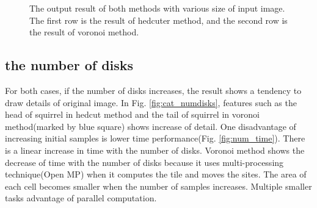 \documentclass[11pt]{article}
\begin{document}
\begin{figure}[hbt]
{    \label{fig:cat_s}
  }\hspace{-3mm}
   \caption{The output result of both methods with various size of input image. The first row is the result of hedcuter method, and the second row is the result of voronoi method. \label{fig:cat_size}}
\end{figure}
\subsection{the number of disks}
For both cases, if the number of disks increases, the result shows a tendency to draw details of original image. In Fig. \ref{fig:cat_numdisks}, features such as the head of squirrel in hedcut method and the tail of squirrel in voronoi method(marked by blue square) shows increase of detail. One disadvantage of increasing initial samples is lower time performance(Fig. \ref{fig:num_time}). There is a linear increase in time with the number of disks. Voronoi method shows the decrease of time with the number of disks because it uses multi-processing technique(Open MP) when it computes the tile and moves the sites. The area of each cell becomes smaller when the number of samples increases. Multiple smaller tasks advantage of parallel computation.
\end{document}
